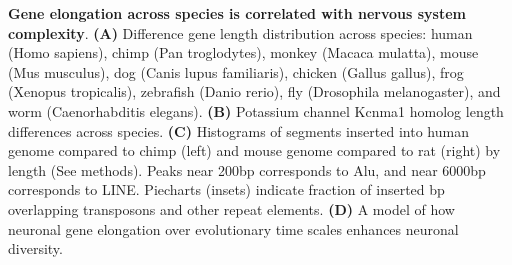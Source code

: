 \textbf{Gene elongation across species is correlated with nervous system complexity}.
\textbf{(A)} Difference gene length distribution across species: human (Homo sapiens), chimp (Pan troglodytes), monkey (Macaca mulatta), mouse (Mus musculus), dog (Canis lupus familiaris), chicken (Gallus gallus), frog (Xenopus tropicalis), zebrafish (Danio rerio), fly (Drosophila melanogaster), and worm (Caenorhabditis  elegans). 
\textbf{(B)} Potassium channel Kcnma1 homolog length differences across species.
\textbf{(C)} Histograms of segments inserted into human genome compared to chimp (left) and mouse genome compared to rat (right) by length (See methods). Peaks near 200bp corresponds to Alu, and near 6000bp corresponds to LINE. Piecharts (insets) indicate fraction of inserted bp overlapping transposons and other repeat elements.
\textbf{(D)} A model of how neuronal gene elongation over evolutionary time scales enhances neuronal diversity. 
